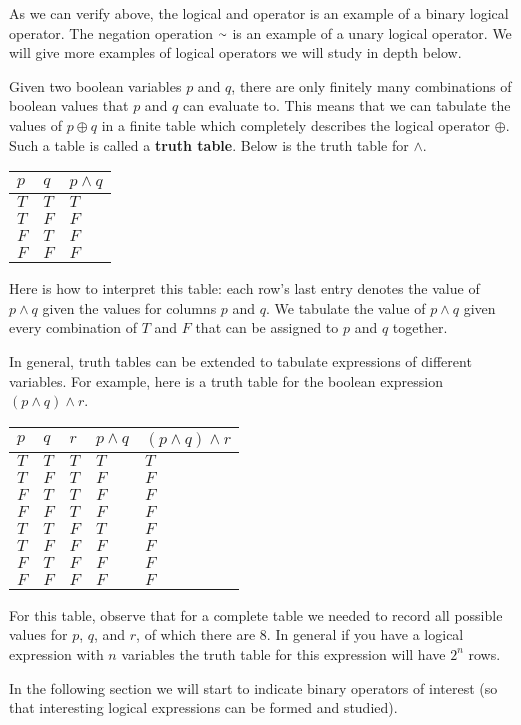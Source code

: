 As we can verify above, the logical and operator is an example of a binary logical operator. The negation operation $\shortsim$ is an example of a unary logical operator. We will give more examples of logical operators we will study in depth below. 

Given two boolean variables $p$ and $q$, there are only finitely many combinations of boolean values that $p$ and $q$ can evaluate to. This means that we can tabulate the values of $p \oplus q$ in a finite table which completely describes the logical operator $\oplus$. Such a table is called a \textbf{truth table}. Below is the truth table for $\land$.

\begin{table}[h]
\centering
\begin{tabular}{|l|l|l|}
\hline
$p$ & $q$ & $p \land q$ \\ \hline
$T$ & $T$ & $T$         \\ \hline
$T$ & $F$ & $F$         \\ \hline
$F$ & $T$ & $F$         \\ \hline
$F$ & $F$ & $F$         \\ \hline
\end{tabular}
\end{table}

Here is how to interpret this table: each row's last entry denotes the value of $p \land q$ given the values for columns $p$ and $q$. We tabulate the value of $p \land q$ given every combination of $T$ and $F$ that can be assigned to $p$ and $q$ together.

In general, truth tables can be extended to tabulate expressions of different variables. For example, here is a truth table for the boolean expression $(p \land q) \land r$.

\begin{table}[h]
\centering
\begin{tabular}{|l|l|l|l|l|}
\hline
$p$ & $q$ & $r$ & $p \land q$ & $(p \land q) \land r$ \\ \hline
$T$ & $T$ & $T$ & $T$   &   $T$   \\ \hline
$T$ & $F$ & $T$ &$F$    &   $F$  \\ \hline
$F$ & $T$ & $T$ &$F$    &   $F$  \\ \hline
$F$ & $F$ & $T$ &$F$    &    $F$ \\ \hline
$T$ & $T$ &$F$ &$T$   &     $F$ \\ \hline
$T$ & $F$ &$F$ &$F$    &     $F$ \\ \hline
$F$ & $T$ & $F$&$F$    &    $F$  \\ \hline
$F$ & $F$ & $F$&$F$    &     $F$ \\ \hline
\end{tabular}
\end{table}

For this table, observe that for a complete table we needed to record all possible values for $p$, $q$, and $r$, of which there are $8$. In general if you have a logical expression with $n$ variables the truth table for this expression will have $2^n$ rows.

In the following section we will start to indicate binary operators of interest (so that interesting logical expressions can be formed and studied).